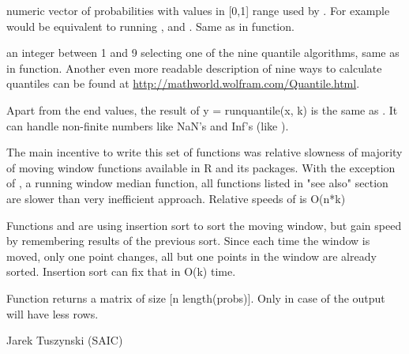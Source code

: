 \begin{Arguments}
\begin{ldescription}
\item[\code{probs}] numeric vector of probabilities with values in [0,1] range 
used by . For example  would be 
equivalent to running ,  and .
Same as  in  function. 
\item[\code{type}] an integer between 1 and 9 selecting one of the nine quantile 
algorithms, same as  in  function. 
Another even more readable description of nine ways to calculate quantiles 
can be found at \url{http://mathworld.wolfram.com/Quantile.html}. 
\end{ldescription}
\end{Arguments}
\begin{Details}\relax
Apart from the end values, the result of y = runquantile(x, k) is the same as 
. It can handle 
non-finite numbers like NaN's and Inf's (like ).

The main incentive to write this set of functions was relative slowness of 
majority of moving window functions available in R and its packages.  With the 
exception of , a running window median function, all 
functions listed in "see also" section are slower than very inefficient 
 approach. Relative 
speeds of  is O(n*k)

Functions  and  are using insertion sort to 
sort the moving window, but gain speed by remembering results of the previous 
sort. Since each time the window is moved, only one point changes, all but one 
points in the window are already sorted. Insertion sort can fix that in O(k) 
time.
\end{Details}
\begin{Value}
Function  returns a matrix of size [n \eqn{\times}{} 
length(probs)]. Only in case of  the output will have 
less rows.
\end{Value}
\begin{Author}\relax
Jarek Tuszynski (SAIC) 
\end{Author}
\begin{References}\relax
{}
\end{References}
